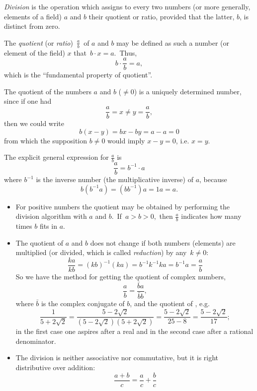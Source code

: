 \documentclass[12pt]{article}
\begin{document}
{\it Division} is the operation which assigns to every two numbers (or more generally, elements of a field) $a$ and $b$ their quotient or ratio, provided that the latter, $b$, is distinct from zero.

The {\it quotient} (or {\it ratio})\, $\frac{a}{b}$\, of $a$ and $b$ may be defined as such a number (or element of the field) $x$ that\, $b \cdot x = a$.\, Thus,
                     $$b\cdot\frac{a}{b} = a,$$
which is the ``fundamental property of quotient''. 

The quotient of the numbers $a$ and $b$ ($\neq 0$) is a 
uniquely determined number, since if one had
$$\frac{a}{b} = x \neq y = \frac{a}{b},$$
then we could write 
$$b(x-y) = bx-by = a-a = 0$$
from which the supposition $b \neq 0$ would imply $x-y = 0$, i.e. 
$x = y$.

The explicit general expression for $\frac{a}{b}$ is
                  $$\frac{a}{b} = b^{-1}\cdot a$$
where $b^{-1}$ is the inverse number (the multiplicative inverse) of $a$, because
                $$b(b^{-1}a) = (bb^{-1})a = 1a = a.$$

\begin{itemize}
 \item For positive numbers the quotient may be obtained by performing the division algorithm with $a$ and $b$.\, If\, $a > b > 0$,\, then $\frac{a}{b}$ indicates how many times $b$ fits in $a$.
  \item The quotient of $a$ and $b$ does not change if both numbers (elements) are multiplied (or divided, which  is called {\em reduction}) by any \,$k \neq 0$:
$$\frac{ka}{kb} = (kb)^{-1}(ka) = b^{-1}k^{-1}ka = b^{-1}a = \frac{a}{b}$$
So we have the method for getting the quotient of complex numbers,
       $$\frac{a}{b} = \frac{\bar{b}a}{\bar{b}b},$$
where $\bar{b}$ is the complex conjugate of $b$, and the quotient of , e.g.
   $$\frac{1}{5+2\sqrt{2}} = \frac{5-2\sqrt{2}}{(5-2\sqrt{2})(5+2\sqrt{2})} = 
\frac{5-2\sqrt{2}}{25-8} = \frac{5-2\sqrt{2}}{17};$$
in the first case one aspires after a real and in the second case after a rational denominator.
 \item The division is neither associative nor commutative, but it is right distributive over addition:
         $$\frac{a+b}{c} = \frac{a}{c}+\frac{b}{c}$$
\end{itemize}
\end{document}

